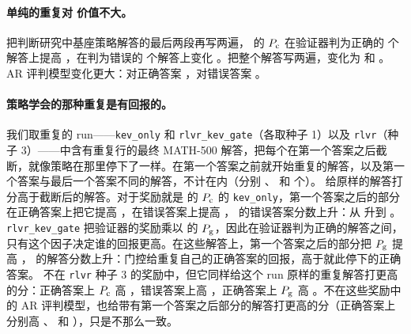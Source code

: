 \paragraph{单纯的重复对 \kev{} 价值不大。} 把判断研究中基座策略解答的最后两段再写两遍，\kev{} 的 $P_{\mathrm{c}}$ 在验证器判为正确的  个解答上提高  ，在判为错误的  个解答上变化  。把整个解答写两遍，变化为  和 。AR 评判模型变化更大：对正确答案 ，对错误答案 。

\paragraph{策略学会的那种重复是有回报的。} 我们取重复的 run——\texttt{kev\_only} 和 \texttt{rlvr\_kev\_gate}（各取种子 1）以及 \texttt{rlvr}（种子 3）——中含有重复行的最终 MATH-500 解答，把每个在第一个答案之后截断，就像策略在那里停下了一样。在第一个答案之前就开始重复的解答，以及第一个答案与最后一个答案不同的解答，不计在内（分别 、 和  个）。\kev{} 给原样的解答打分高于截断后的解答。对于奖励就是 \kev{} 的 $P_{\mathrm{c}}$ 的 \texttt{kev\_only}，第一个答案之后的部分在正确答案上把它提高  ，在错误答案上提高  ， 的错误答案分数上升：从  升到 。\texttt{rlvr\_kev\_gate} 把验证器的奖励乘以 \kev{} 的 $P_{\mathrm{g}}$，因此在验证器判为正确的解答之间，只有这个因子决定谁的回报更高。在这些解答上，第一个答案之后的部分把 $P_{\mathrm{g}}$ 提高  ， 的解答分数上升：门控给重复自己的正确答案的回报，高于就此停下的正确答案。\kev{} 不在 \texttt{rlvr} 种子 3 的奖励中，但它同样给这个 run 原样的重复解答打更高的分：正确答案上 $P_{\mathrm{c}}$ 高  ，错误答案上高  ，正确答案上 $P_{\mathrm{g}}$ 高 。不在这些奖励中的 AR 评判模型，也给带有第一个答案之后部分的解答打更高的分（正确答案上分别高 、 和 ），只是不那么一致。


